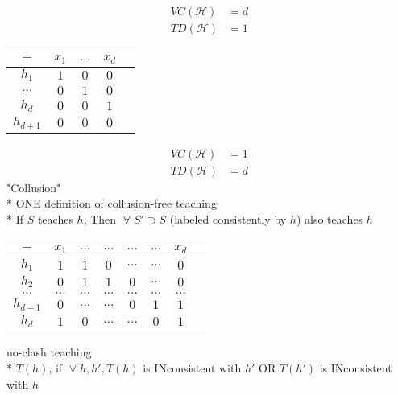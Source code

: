 \documentclass{article}
\begin{document}
\begin{align*}
VC\left(\mathcal{H}\right)  &= d 
\\ TD\left(\mathcal{H}\right)  &= 1
\end{align*}
\begin{center} \begin{tabular}{|c|c|c|c|c|}
\hline
 $-$ &$x_{1}$ &$...$ &$x_{d}$\\ \hline
$h_{1}$ &$1$ &$0$ &$0$\\ \hline
$...$ &$0$ &$1$ &$0$\\ \hline
$h_{d}$ &$0$ &$0$ &$1$\\ \hline
$h_{d+1}$ &$0$ &$0$ &$0$\\ \hline
\end{tabular} \end{center}
\begin{align*}
VC\left(\mathcal{H}\right)  &= 1
\\ TD\left(\mathcal{H}\right)  &= d 
\end{align*}
"Collusion"
\\* ONE definition of collusion-free teaching
\\* If $S $ teaches $h $, Then $\;\forall\; S' \supset S $ (labeled consistently by $h $) also teaches $h $
\newline \newline
\begin{center} \begin{tabular}{|c|c|c|c|c|c|c|c|}
\hline
 $-$ &$x_{1}$ &$...$ &$...$ &$...$ &$...$ &$x_{d}$\\ \hline
$h_{1}$ &$1$ &$1$ &$0$ &$...$ &$...$ &$0$\\ \hline
$h_{2}$ &$0$ &$1$ &$1$ &$0$ &$...$ &$0$\\ \hline
$...$ &$...$ &$...$ &$...$ &$...$ &$...$ &$...$\\ \hline
$h_{d-1}$ &$0$ &$...$ &$...$ &$0$ &$1$ &$1$\\ \hline
$h_{d}$ &$1$ &$0$ &$...$ &$...$ &$0$ &$1$\\ \hline
\end{tabular} \end{center}
no-clash teaching
\\* $T\left(h\right) $, if $\;\forall\; h, h', T\left(h\right) $ is INconsistent with $h'$ OR $T\left(h'\right) $ is INconsistent with $h $
\newline \newline
\begin{figure}[H] \centering {} 
\end{figure}
\end{document}
